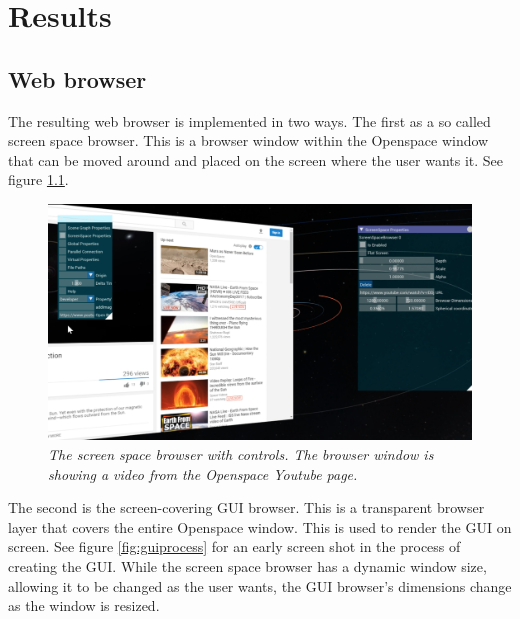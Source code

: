 \chapter{Results}
\label{cha:results}




\section{Web browser}

The resulting web browser is implemented in two ways. The first as a so called screen space browser. This is a browser window within the Openspace window that can be moved around and placed on the screen where the user wants it. See figure \ref{fig:screenspace}.

\begin{figure}[!h]
\centering
\includegraphics[width=0.7\linewidth]{./figures/screenspace.png}
\caption{\emph{The screen space browser with controls. The browser window is showing a video from the Openspace Youtube page.}}\label{fig:screenspace}
\end{figure}

The second is the screen-covering GUI browser. This is a transparent browser layer that covers the entire Openspace window. This is used to render the GUI on screen. See figure \ref{fig:guiprocess} for an early screen shot in the process of creating the GUI. While the screen space browser has a dynamic window size, allowing it to be changed as the user wants, the GUI browser's dimensions change as the window is resized.

